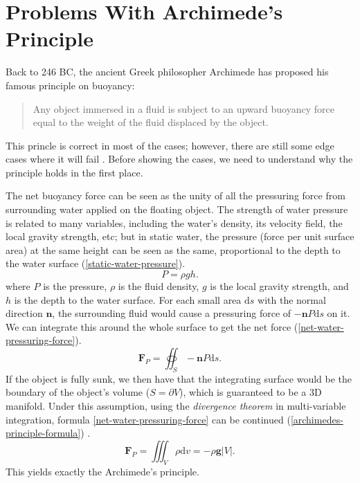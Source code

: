 \section{Problems With Archimede's Principle}

Back to 246 BC, the ancient Greek philosopher Archimede has proposed his famous principle on buoyancy:
\begin{quote}
	Any object immersed in a fluid is subject to an upward buoyancy force equal to the weight of the fluid displaced by the object.
\end{quote}
This princle is correct in most of the cases;
however, there are still some edge cases where it will fail \cite{bierman2003reconsidering} \cite{mohazzab2017archimedes}.
Before showing the cases, we need to understand why the principle holds in the first place.

The net buoyancy force can be seen as the unity of all the pressuring force from surrounding water applied on the floating object.
The strength of water pressure is related to many variables, including the water's density, its velocity field, the local gravity strength, etc;
but in static water, the pressure (force per unit surface area) at the same height can be seen as the same, proportional to the depth to the water surface (\ref{static-water-pressure}).
\begin{equation}
	P=\rho gh.
	\label{static-water-pressure}
\end{equation}
where $P$ is the pressure, $\rho$ is the fluid density, $g$ is the local gravity strength, and $h$ is the depth to the water surface.
For each small area $\mathrm{d}s$ with the normal direction $\mathbf n$, the surrounding fluid would cause a pressuring force of $-\mathbf nP\mathrm{d}s$ on it.
We can integrate this around the whole surface to get the net force (\ref{net-water-pressuring-force}).
\begin{equation}
	\mathbf{F}_P=\oiint_{S}-\mathbf nP\mathrm{d}s.
	\label{net-water-pressuring-force}
\end{equation}
If the object is fully sunk, we then have that the integrating surface would be the boundary of the object's volume ($S=\partial V$), which is guaranteed to be a 3D manifold.
Under this assumption, using the \emph{divergence theorem} in multi-variable integration, formula \ref{net-water-pressuring-force} can be continued (\ref{archimedes-principle-formula}) \cite{pfeffer1986divergence}.
\begin{equation}
	\mathbf{F}_P=\iiint_{V}\rho\mathrm{d}v=-\rho\mathbf{g}|V|.
	\label{archimedes-principle-formula}
\end{equation}
This yields exactly the Archimede's principle.

